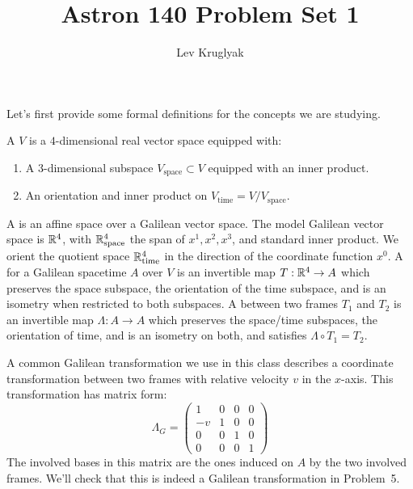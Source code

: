 \documentclass{../../templates/lkx_pset}
\title{Astron 140 Problem Set 1}
\author{Lev Kruglyak}
\begin{document}
\maketitle

Let's first provide some formal definitions for the concepts we are studying.
\begin{definition}
	A  $V$ is a $4$-dimensional real vector space equipped with:
	\begin{enumerate}
		\item A $3$-dimensional subspace $V_{\textrm{space}}\subset V$ equipped with an inner product.
		\item An orientation and inner product on $V_{\textrm{time}} = V/V_{\textrm{space}}$.
	\end{enumerate}
	A  is an affine space over a Galilean vector space. The model Galilean vector space is $\mathbb{R}^4$, with $\mathbb{R}^4_{\textrm{space}}$ the span of $x^1,x^2,x^3$, and standard inner product. We orient the quotient space $\mathbb{R}^4_{\textrm{time}}$ in the direction of the coordinate function $x^0$. A  for a Galilean spacetime $A$ over $V$ is an invertible map $T : \mathbb{R}^4 \to A$ which preserves the space subspace, the orientation of the time subspace, and is an isometry when restricted to both subspaces. A  between two frames $T_1$ and $T_2$ is an invertible map $\Lambda : A \to A$ which preserves the space/time subspaces, the orientation of time, and is an isometry on both, and satisfies $\Lambda \circ T_1 = T_2$.
\end{definition}

A common Galilean transformation we use in this class describes a coordinate transformation between two frames with relative velocity $v$ in the $x$-axis. This transformation has matrix form:
	\[
		\Lambda_G =
		\begin{pmatrix}
			1  & 0 & 0 & 0 \\
			-v & 1 & 0 & 0 \\
			0  & 0 & 1 & 0 \\
			0  & 0 & 0 & 1
		\end{pmatrix}
	\]
The involved bases in this matrix are the ones induced on $A$ by the two involved frames. We'll check that this is indeed a Galilean transformation in Problem~5.
\end{document}
